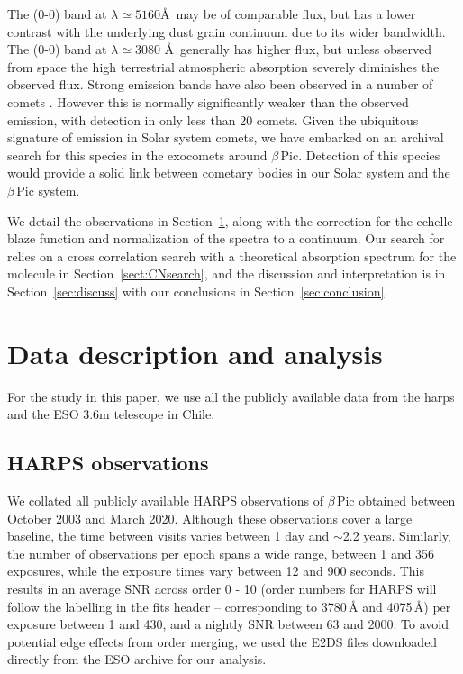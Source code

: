 \documentclass{aa}
\newcommand{\bp}{$\beta$\,Pic}
\begin{document}
The  (0-0) band at $\lambda\simeq 5160$\AA{}\ may be of comparable flux, but has a lower contrast with the underlying dust grain continuum due to its wider bandwidth.
%
The  (0-0) band at $\lambda\simeq 3080$ \AA{}\ generally has higher flux, but unless observed from space the high terrestrial atmospheric absorption severely diminishes the observed flux.
%
Strong  emission bands have also been observed in a number of comets \citep[the strongest ones are the (3-0) and (2-0) $\mathrm{A^2\Pi-X^2\Sigma}$; ][]{Biver2018}.
%
However this is normally significantly weaker than the observed  emission, with detection in only less than 20 comets.
%
Given the ubiquitous signature of  emission in Solar system comets, we have embarked on an archival search for this species in the exocomets around \bp{}.
%
Detection of this species would provide a solid link between cometary bodies in our Solar system and the \bp{} system.

We detail the observations in Section~\ref{sec:data}, along with the correction for the echelle blaze function and normalization of the spectra to a continuum.
%
Our search for  relies on a cross correlation search with a theoretical absorption spectrum for the molecule in Section~\ref{sect:CNsearch}, and the discussion and interpretation is in Section~\ref{sec:discuss} with our conclusions in Section~\ref{sec:conclusion}.

\section{Data description and analysis}\label{sec:data}

For the study in this paper, we use all the publicly available data from the \ac{harps} and the ESO 3.6m telescope in Chile.

\subsection{HARPS observations}

We collated all publicly available HARPS observations of \bp{} obtained between October 2003 and March 2020.
%
Although these observations cover a large baseline, the time between visits varies between 1 day and $\sim$2.2 years.
%
Similarly, the number of observations per epoch spans a wide range, between 1 and 356 exposures, while the exposure times vary between 12 and 900 seconds.
%
This results in an average SNR across order 0 - 10 (order numbers for HARPS will follow the labelling in the fits header -- corresponding to 3780\,\AA{} and 4075\,\AA) per exposure between 1 and 430, and a nightly SNR between 63 and 2000.
%
To avoid potential edge effects from order merging,  we used the E2DS files downloaded directly from the ESO archive for our analysis.
\end{document}
